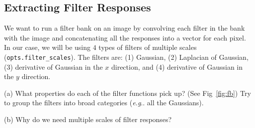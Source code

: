 \documentclass[11pt]{article}
\makeatletter
\numberwithin{equation}{section} %
\numberwithin{figure}{section} %
\numberwithin{table}{section} %
\DeclareRobustCommand\onedot{\futurelet\@let@token\@onedot}
\def\@onedot{\ifx\@let@token.\else.\null\fi\xspace}
\def\eg{\emph{e.g}\onedot} \def\Eg{\emph{E.g}\onedot}
\def\ie{\emph{i.e}\onedot} \def\Ie{\emph{I.e}\onedot}
\makeatother
\begin{document}


\subsection{Extracting Filter Responses}

We want to run a filter bank on an image by convolving each filter in the bank with the image and concatenating all the responses into a vector for each pixel.
In our case, we will be using $4$ types of filters of multiple scales ({\tt opts.filter\_scales}).
The filters are: (1) Gaussian, (2) Laplacian of Gaussian, (3) derivative of Gaussian in the $x$ direction, and (4) derivative of Gaussian in the $y$ direction.
\par {}
(a) What properties do each of the filter functions pick up? (See Fig~\ref{fig:fb}) 
Try to group the filters into broad categories (\eg all the Gaussians). 

(b) Why do we need multiple scales of filter responses? 

\begin{your_solution}[title=Q1.1.1 (a)(b),height=6cm,width=\linewidth]

\end{your_solution}
\end{document}
